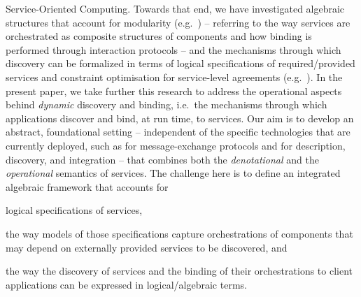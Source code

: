 \documentclass{LMCS}
\begin{document}
\begin{minisection}{Service-Oriented Computing.}
  Towards that end, we have investigated algebraic structures that account for modularity (e.g.~\cite{Fiadeiro-Lopes-Bocchi:Algebraic-semantics-of-service-component-modules-2007,Fiadeiro-Schmitt:Structured-cospans-2007}) -- referring to the way services are orchestrated as composite structures of components and how binding is performed through interaction protocols -- and the mechanisms through which discovery can be formalized in terms of logical specifications of required/provided services and constraint optimisation for service-level agreements (e.g.~\cite{Fiadeiro-Lopes-Bocchi:An-abstract-model-for-service-discovery-and-binding-2011,Fiadeiro-Lopes:Dynamic-reconfiguration-in-service-oriented-architectures-2013}).
  In the present paper, we take further this research to address the operational aspects behind \emph{dynamic} discovery and binding, i.e.\ the mechanisms through which applications discover and bind, at run time, to services.  Our aim is to develop an abstract, foundational setting -- independent of the specific technologies that are currently deployed, such as  for message-exchange protocols and  for description, discovery, and integration -- that combines both the \emph{denotational} and the \emph{operational} semantics of services. 
  The challenge here is to define an integrated algebraic framework that accounts for
  \begin{inlinenum}

  \item logical specifications of services,
    
  \item the way models of those specifications capture orchestrations of components that may depend on externally provided services  to be discovered, and
    
  \item the way the discovery of services and the binding of their orchestrations to client applications can be expressed in logical/algebraic terms.
    
  \end{inlinenum}
\end{minisection}
\end{document}

